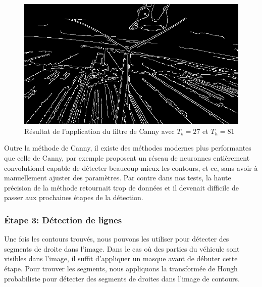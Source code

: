 
\begin{figure}[htp]
  \centering
  \includegraphics[width=0.6\linewidth]{images/canny.png}
  \caption{Résultat de l'application du filtre de Canny avec $T_b = 27$ et $T_h = 81$}
  \label{fig:canny}
\end{figure}

Outre la méthode de Canny, il existe des méthodes modernes plus performantes que celle de Canny, par exemple \citep{Xie2015} proposent un réseau de neuronnes entièrement convolutionel capable de détecter beaucoup mieux les contours, et ce, sans avoir à manuellement ajuster des paramètres. Par contre dans nos tests, la haute précision de la méthode retournait trop de données et il devenait difficile de passer aux prochaines étapes de la détection.

\subsubsection{Étape 3: Détection de lignes}

Une fois les contours trouvés, nous pouvons les utiliser pour détecter des segments de droite dans l'image. Dans le cas où des parties du véhicule sont visibles dans l'image, il suffit d'appliquer un masque avant de débuter cette étape. Pour trouver les segments, nous appliquons la transformée de Hough probabiliste \citep{Matas2000} pour détecter des segments de droites dans l'image de contours.

